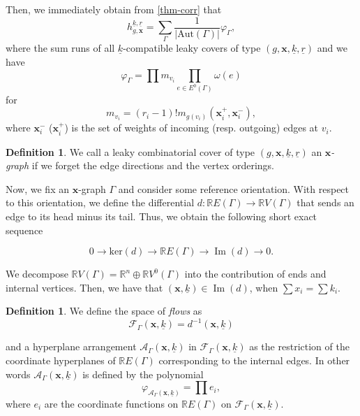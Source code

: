 \documentclass[10pt,a4paper,oneside,no-math,reqno]{amsart}%
\theoremstyle{plain}
\theoremstyle{definition}
\newtheorem{definition}[theorem]{Definition}
\theoremstyle{remark}
\numberwithin{equation}{section}
\renewcommand{\phi}{\varphi}
\newcommand{\1}{\mathds{1}}
\newcommand{\<}{\langle}
\renewcommand{\>}{\rangle}
\DeclareMathOperator{\im}{Im}
\begin{document}
Then, we immediately obtain from \cref{thm-corr} that
\begin{equation}
    h^{\underline{k},\underline{r}}_{g,\mathbf{x}}
    =
    \sum_\Gamma\frac{1}{|\mathrm{Aut}(\Gamma)|}\phi_\Gamma,
\end{equation}
where the sum runs of all $\underline{k}$-compatible leaky covers of type $(g,\textbf{x},\underline{k},\underline{r})$ and we have
\begin{equation}
    \phi_\Gamma=\prod m_{v_i}\prod_{e\in E^0(\Gamma)}\omega(e)
\end{equation}
for
\begin{equation}
    m_{v_i}
    =
    (r_i-1)! m_{g(v_i)}(\textbf{x}_i^+,\textbf{x}_i^-),
\end{equation}
where $\textbf{x}_i^-$ ($\textbf{x}_i^+$) is the set of weights of incoming (resp. outgoing) edges at $v_i$.

\begin{definition}
    We call a leaky combinatorial cover of type $(g,\mathbf{x},\underline{k},\underline{r})$ an \emph{$\mathbf{x}$-graph} if we forget the edge directions and the vertex orderings.
\end{definition}


Now, we fix an $\textbf{x}$-graph $\Gamma$ and consider some reference orientation. With respect to this orientation, we define the differential $d\colon \mathbb{R}E(\Gamma)\to\mathbb{R}V(\Gamma)$ that sends an edge to its head minus its tail. Thus, we obtain the following short exact sequence

\begin{equation}
    0\to\mathrm{ker}(d)\to\mathbb{R}E(\Gamma)\to \im (d)\to 0.
\end{equation}

We decompose $\mathbb{R}V(\Gamma)=\mathbb{R}^n\oplus\mathbb{R}V^0(\Gamma)$ into the contribution of ends and internal vertices. Then, we have that $(\mathbf{x},\underline{k})\in\im (d)$, when $\sum x_i=\sum k_i$.


\begin{definition}
    We define the space of \emph{flows} as
    \begin{equation}
        \mathcal{F}_\Gamma(\textbf{x},\underline{k})=d^{-1}(\textbf{x},\underline{k})
    \end{equation}

    and a hyperplane arrangement $\mathcal{A}_\Gamma(\textbf{x},\underline{k})$ in $\mathcal{F}_\Gamma(\textbf{x},\underline{k})$ as the restriction of the coordinate hyperplanes of $\mathbb{R}E(\Gamma)$ corresponding to the internal edges. In other words $\mathcal{A}_\Gamma(\textbf{x},\underline{k})$ is defined by the polynomial
    \begin{equation}
        \phi_{\mathcal{A}_\Gamma(\textbf{x},\underline{k})}=\prod e_i,
    \end{equation}
    where $e_i$ are the coordinate functions on $\mathbb{R}E(\Gamma)$ on $\mathcal{F}_\Gamma(\textbf{x},\underline{k})$.
\end{definition}
\end{document}
